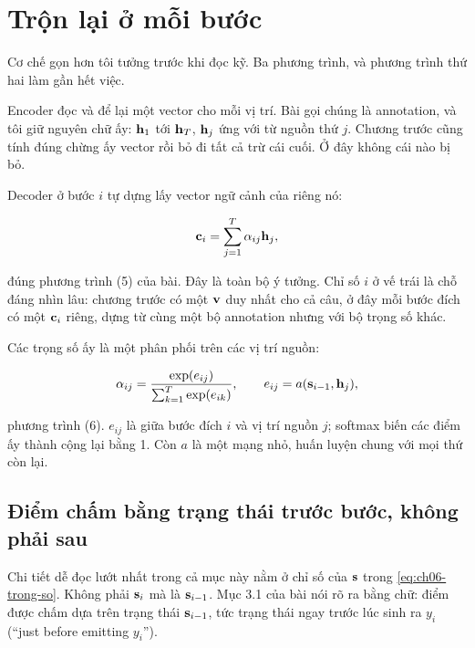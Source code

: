 \section{Trộn lại ở mỗi bước}
\label{sec:ch06-tron-lai}

%
Cơ chế gọn hơn tôi tưởng trước khi đọc kỹ. Ba phương trình, và phương trình
thứ hai làm gần hết việc.

Encoder đọc  và để lại một vector cho mỗi vị
trí. Bài gọi chúng là annotation, và tôi giữ nguyên chữ ấy: \(\mathbf{h}_1\) tới
\(\mathbf{h}_{T}\), \(\mathbf{h}_j\) ứng với từ nguồn thứ \(j\). Chương trước cũng
tính đúng chừng ấy vector rồi bỏ đi tất cả trừ cái cuối. Ở đây không cái nào bị
bỏ.

Decoder ở bước \(i\) tự dựng lấy vector ngữ cảnh của riêng nó:

\begin{equation}
  \mathbf{c}_i = \sum_{j=1}^{T} \alpha_{ij} \mathbf{h}_j,
  \label{eq:ch06-tong-co-trong-so}
\end{equation}

đúng phương trình (5) của bài. Đây là toàn bộ ý tưởng. Chỉ số \(i\) ở vế trái
là chỗ đáng nhìn lâu: chương trước có một \(\mathbf{v}\) duy nhất cho cả câu, ở
đây mỗi bước đích có một \(\mathbf{c}_i\) riêng, dựng từ cùng một bộ annotation
nhưng với bộ trọng số khác.

Các trọng số ấy là một phân phối trên các vị trí nguồn:

\begin{equation}
  \alpha_{ij} = \frac{\exp(e_{ij})}{\sum_{k=1}^{T} \exp(e_{ik})},
  \qquad
  e_{ij} = a(\mathbf{s}_{i-1}, \mathbf{h}_j),
  \label{eq:ch06-trong-so}
\end{equation}

phương trình (6). \(e_{ij}\) là  giữa bước
đích \(i\) và vị trí nguồn \(j\); softmax biến các điểm ấy thành
 cộng lại bằng 1. Còn \(a\) là một
mạng nhỏ, huấn luyện chung với mọi thứ còn lại.

\subsection*{Điểm chấm bằng trạng thái trước bước, không phải sau}

%
Chi tiết dễ đọc lướt nhất trong cả mục này nằm ở chỉ số của \(\mathbf{s}\) trong
\eqref{eq:ch06-trong-so}. Không phải \(\mathbf{s}_i\) mà là \(\mathbf{s}_{i-1}\).
Mục 3.1 của bài nói rõ ra bằng chữ: điểm được chấm dựa trên trạng thái
\(\mathbf{s}_{i-1}\), tức trạng thái ngay trước lúc sinh ra \(y_i\)
(\enquote{just before emitting \(y_i\)}).

